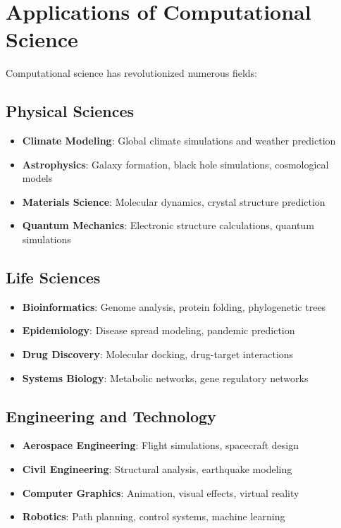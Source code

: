 \section{Applications of Computational Science}

Computational science has revolutionized numerous fields:

\subsection{Physical Sciences}
\begin{itemize}
  \item \textbf{Climate Modeling}: Global climate simulations and weather prediction
  \item \textbf{Astrophysics}: Galaxy formation, black hole simulations, cosmological models
  \item \textbf{Materials Science}: Molecular dynamics, crystal structure prediction
  \item \textbf{Quantum Mechanics}: Electronic structure calculations, quantum simulations
\end{itemize}

\subsection{Life Sciences}
\begin{itemize}
  \item \textbf{Bioinformatics}: Genome analysis, protein folding, phylogenetic trees
  \item \textbf{Epidemiology}: Disease spread modeling, pandemic prediction
  \item \textbf{Drug Discovery}: Molecular docking, drug-target interactions
  \item \textbf{Systems Biology}: Metabolic networks, gene regulatory networks
\end{itemize}

\subsection{Engineering and Technology}
\begin{itemize}
  \item \textbf{Aerospace Engineering}: Flight simulations, spacecraft design
  \item \textbf{Civil Engineering}: Structural analysis, earthquake modeling
  \item \textbf{Computer Graphics}: Animation, visual effects, virtual reality
  \item \textbf{Robotics}: Path planning, control systems, machine learning
\end{itemize}

